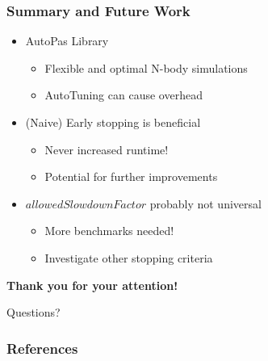 \documentclass[
	10pt,
	t		%
]{beamer}
\begin{document}
\begin{frame}
    \frametitle{Summary and Future Work}

    \begin{itemize}
        \item AutoPas Library
              \begin{itemize}
                  \item Flexible and optimal N-body simulations
                  \item AutoTuning can cause overhead
              \end{itemize}
        \item (Naive) Early stopping is beneficial
              \begin{itemize}
                  \item Never increased runtime!
                  \item Potential for further improvements
              \end{itemize}
        \item $allowedSlowdownFactor$ probably not universal
              \begin{itemize}
                  \item More benchmarks needed!
                  \item Investigate other stopping criteria
              \end{itemize}
    \end{itemize}
\end{frame}


\begin{frame}
    \begin{center}
        \vspace{1cm}
        {\large \textbf{Thank you for your attention!}}

        \vspace{2cm}

        \Huge{Questions?}
    \end{center}
\end{frame}




\begin{frame}
    \frametitle{References}
    \footnotesize
    
    
\end{frame}
\end{document}
